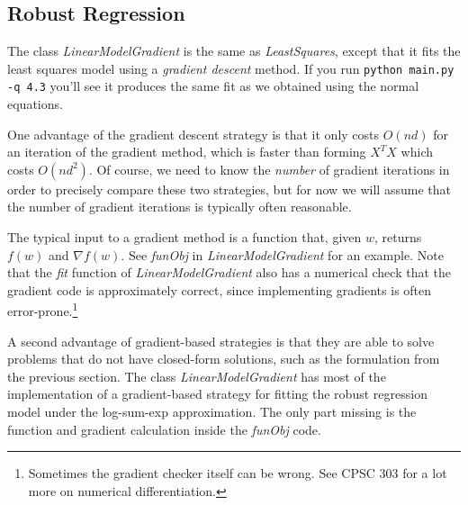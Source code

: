 \documentclass{article}
\begin{document}
\subsection{Robust Regression}

The class \emph{LinearModelGradient} is the same as \emph{LeastSquares}, except that it fits the least squares model using a \emph{gradient descent} method. If you run \verb|python main.py -q 4.3| you'll see it produces the same fit as we obtained using the normal equations.

One advantage of the gradient descent strategy is that it only costs $O(nd)$ for an iteration of the gradient method, which is faster than forming $X^TX$ which costs $O(nd^2)$. Of course, we need to know the \emph{number} of gradient iterations in order to precisely compare these two strategies, but for now we will assume that the number of gradient iterations is typically often reasonable.

The typical input to a gradient method is a function that, given $w$, returns $f(w)$ and $\nabla f(w)$. See \emph{funObj} in \emph{LinearModelGradient} for an example. Note that the \emph{fit} function of \emph{LinearModelGradient} also has a numerical check that the gradient code is approximately correct, since implementing gradients is often error-prone.\footnote{Sometimes the gradient checker itself can be wrong. See CPSC 303 for a lot more on numerical differentiation.}

A second advantage of gradient-based strategies is that they are able to solve 
problems that do not have closed-form solutions, such as the formulation from the
previous section. The class \emph{LinearModelGradient} has most of the implementation 
of a gradient-based strategy for fitting the robust regression model under the log-sum-exp approximation. 
The only part missing is the function and gradient calculation inside the \emph{funObj} code. 

\end{document}

